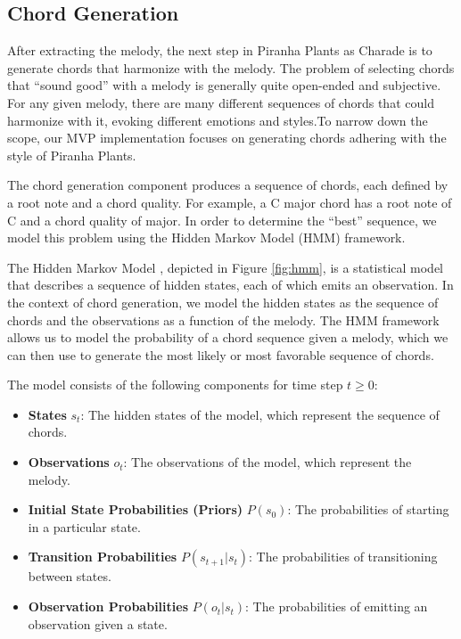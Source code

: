 \subsection{Chord Generation}
\label{sec:chord_generation}

After extracting the melody, the next step in Piranha Plants as Charade is to generate chords that harmonize with the melody. The problem of selecting chords that ``sound good'' with a melody is generally quite open-ended and subjective. For any given melody, there are many different sequences of chords that could harmonize with it, evoking different emotions and styles.To narrow down the scope, our MVP implementation focuses on generating chords adhering with the style of Piranha Plants.

The chord generation component produces a sequence of chords, each defined by a root note and a chord quality. For example, a C major chord has a root note of C and a chord quality of major. In order to determine the ``best'' sequence, we model this problem using the Hidden Markov Model (HMM) framework.

The Hidden Markov Model \autocite{HMM:2023}, depicted in Figure \ref{fig:hmm}, is a statistical model that describes a sequence of hidden states, each of which emits an observation. In the context of chord generation, we model the hidden states as the sequence of chords and the observations as a function of the melody. The HMM framework allows us to model the probability of a chord sequence given a melody, which we can then use to generate the most likely or most favorable sequence of chords.

The model consists of the following components for time step $t \geq 0$:
\begin{itemize}
    \item \textbf{States} $s_t$: The hidden states of the model, which represent the sequence of chords.
    \item \textbf{Observations} $o_t$: The observations of the model, which represent the melody.
    \item \textbf{Initial State Probabilities (Priors)} $P(s_0)$: The probabilities of starting in a particular state.
    \item \textbf{Transition Probabilities} $P(s_{t+1} | s_t)$: The probabilities of transitioning between states.
    \item \textbf{Observation Probabilities} $P(o_t | s_t)$: The probabilities of emitting an observation given a state.
\end{itemize}

